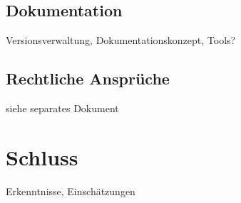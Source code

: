 \documentclass[a4paper,ngerman, 12pt]{report}
\begin{document}
\section{Dokumentation}
Versionsverwaltung, Dokumentationskonzept, Tools?

\section{Rechtliche Ansprüche}
siehe separates Dokument


\chapter{Schluss}
Erkenntnisse, Einschätzungen



{}	

\end{document}
